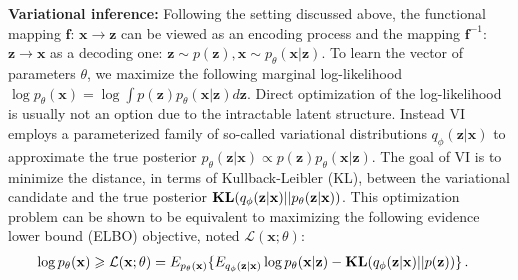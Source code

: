 \documentclass{article} %
\newcommand{\belhal}[1]{{\color{red}{\bf\sf [BK: #1]}}}
\begin{document}
\vspace{0.08in}
\textbf{Variational inference:}
Following the setting discussed above, the functional mapping $\mathbf{f}$: $\mathbf{x} \xrightarrow{} \mathbf{z}$ can be viewed as an encoding process and the mapping $\mathbf{f}^{-1}$: $\mathbf{z} \xrightarrow{} \mathbf{x}$ as a decoding one: $\mathbf{z} \sim p(\mathbf{z}), \mathbf{x} \sim p_\theta(\mathbf{x}|\mathbf{z}).$
To learn the vector of parameters $\theta$, we maximize the following marginal log-likelihood $ \log p_\theta(\mathbf{x}) = \log \int p(\mathbf{z})  p_\theta(\mathbf{x}|\mathbf{z})d\mathbf{z}$.
Direct optimization of the log-likelihood is usually not an option due to the intractable latent structure. Instead VI employs a parameterized family of so-called variational distributions $q_\phi(\mathbf{z}|\mathbf{x})$ to approximate the true posterior $p_\theta(\mathbf{z}|\mathbf{x}) \varpropto  p(\mathbf{z})  p_\theta(\mathbf{x}|\mathbf{z})$.
The goal of VI is to minimize the distance, in terms of Kullback-Leibler (KL), between the variational candidate and the true posterior $\textbf{\text{KL}}(q_\phi(\mathbf{z}|\mathbf{x})||p_\theta(\mathbf{z}|\mathbf{x}) )$.
This optimization problem can be shown to be equivalent to maximizing the following evidence lower bound (ELBO) objective, noted $\mathcal{L}(\mathbf{x}; \theta)$: 
\begin{align}\label{eq:vi_elbo}
    \log p_\theta(\mathbf{x}) \geqslant \mathcal{L}(\mathbf{x}; \theta) &= E_{p_\theta(\mathbf{x})} 
     \{E_{q_\phi(\mathbf{z}|\mathbf{x})} \log p_\theta(\mathbf{x}|\mathbf{z})  - \textbf{\text{KL}}(q_\phi(\mathbf{z}|\mathbf{x})||p(\mathbf{z}))\} \, .
\end{align}
\end{document}
